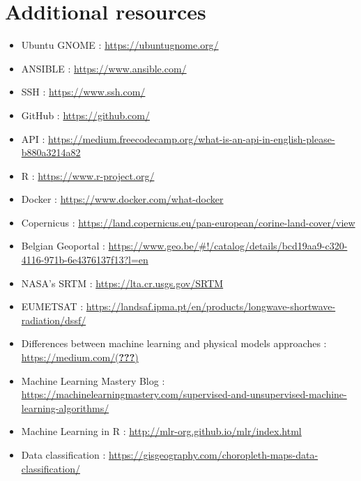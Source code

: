 \documentclass[12pt,twoside]{reedthesis}
\theoremstyle{definition}
\theoremstyle{definition}
\theoremstyle{definition}
\theoremstyle{remark}
\begin{document}
\chapter{Additional resources}\label{additional-resources}
\begin{itemize}
\item
  Ubuntu GNOME : \url{https://ubuntugnome.org/}
\item
  ANSIBLE : \url{https://www.ansible.com/}
\item
  SSH : \url{https://www.ssh.com/}
\item
  GitHub : \url{https://github.com/}
\item
  API :
  \url{https://medium.freecodecamp.org/what-is-an-api-in-english-please-b880a3214a82}
\item
  R : \url{https://www.r-project.org/}
\item
  Docker : \url{https://www.docker.com/what-docker}
\item
  Copernicus :
  \url{https://land.copernicus.eu/pan-european/corine-land-cover/view}
\item
  Belgian Geoportal :
  \url{https://www.geo.be/\#!/catalog/details/bcd19aa9-c320-4116-971b-6e4376137f13?l=en}
\item
  NASA's SRTM : \url{https://lta.cr.usgs.gov/SRTM}
\item
  EUMETSAT :
  \url{https://landsaf.ipma.pt/en/products/longwave-shortwave-radiation/dssf/}
\item
  Differences between machine learning and physical models approaches :
  \href{https://medium.com/@ageitgey/machine-learning-is-fun-80ea3ec3c471}{https://medium.com/({\textbf{???}})}
\item
  Machine Learning Mastery Blog :
  \url{https://machinelearningmastery.com/supervised-and-unsupervised-machine-learning-algorithms/}
\item
  Machine Learning in R : \url{http://mlr-org.github.io/mlr/index.html}
\item
  Data classification :
  \url{https://gisgeography.com/choropleth-maps-data-classification/}
\end{itemize}
\end{document}

